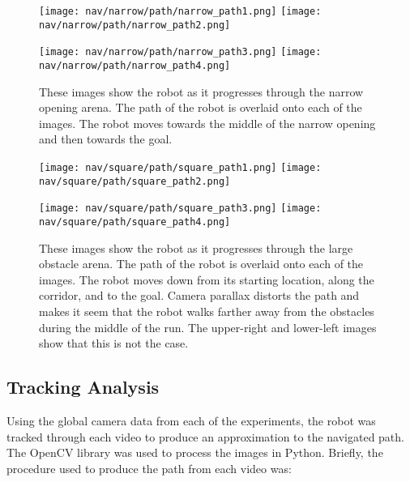 \begin{figure}
  \centerline{
    \texttt{[image: nav/narrow/path/narrow\_path1.png]}
    \texttt{[image: nav/narrow/path/narrow\_path2.png]}
  }
  \vspace*{0.05in}
  \centerline{
    \texttt{[image: nav/narrow/path/narrow\_path3.png]}
    \texttt{[image: nav/narrow/path/narrow\_path4.png]}
  }
    \caption{These images show the robot as it progresses through the narrow opening arena. 
             The path of the robot is overlaid onto each of the images.
             The robot moves towards the middle of the narrow opening and then towards the goal.}
    \label{fig:nav_narrow_frames1}
        \vspace*{-0.07in}
\end{figure}

\begin{figure}
  \centerline{
    \texttt{[image: nav/square/path/square\_path1.png]}
    \texttt{[image: nav/square/path/square\_path2.png]}
  }
  \vspace*{0.05in}
  \centerline{
    \texttt{[image: nav/square/path/square\_path3.png]}
    \texttt{[image: nav/square/path/square\_path4.png]}
  }
    \caption{These images show the robot as it progresses through the large obstacle arena. 
             The path of the robot is overlaid onto each of the images.
             The robot moves down from its starting location, along the corridor, and to the goal.
             Camera parallax distorts the path and makes it seem that the robot walks farther away
             from the obstacles during the middle of the run. The upper-right and lower-left images
             show that this is not the case.}
    \label{fig:nav_square_frames1}
        \vspace*{-0.07in}
\end{figure}

\FloatBarrier
\subsection{Tracking Analysis} \label{subsec:tracking_analysis}
Using the global camera data from each of the experiments, the robot was tracked through
each video to produce an approximation to the navigated path. The OpenCV library was used to 
process the images in Python. Briefly, the procedure used to produce the path from each video was:

